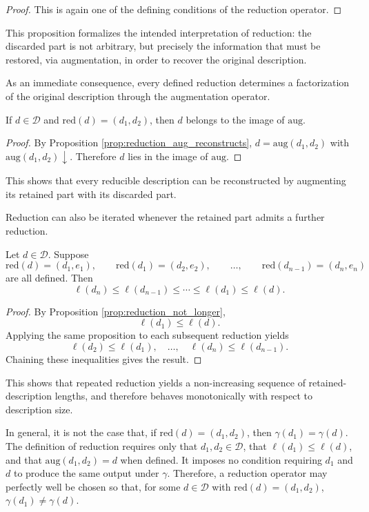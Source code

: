 \begin{proof}
This is again one of the defining conditions of the reduction operator.
\end{proof}

This proposition formalizes the intended interpretation of reduction: the discarded part is not arbitrary, but precisely the information that must be restored, via augmentation, in order to recover the original description.

As an immediate consequence, every defined reduction determines a factorization of the original description through the augmentation operator.

\begin{corollary}
If \(d \in \mathcal{D}\) and \(\mathrm{red}(d)=(d_1,d_2)\), then \(d\) belongs to the image of \(\mathrm{aug}\).
\end{corollary}

\begin{proof}
By Proposition \ref{prop:reduction_aug_reconstructs}, $d=\mathrm{aug}(d_1,d_2)$ with \(\mathrm{aug}(d_1,d_2)\downarrow\). Therefore \(d\) lies in the image of \(\mathrm{aug}\).
\end{proof}

This shows that every reducible description can be reconstructed by augmenting its retained part with its discarded part.

Reduction can also be iterated whenever the retained part admits a further reduction.

\begin{proposition}
Let \(d \in \mathcal{D}\). Suppose
\[
\mathrm{red}(d)=(d_1,e_1),
\qquad
\mathrm{red}(d_1)=(d_2,e_2),
\qquad
\ldots,
\qquad
\mathrm{red}(d_{n-1})=(d_n,e_n)
\]
are all defined. Then
\[
\ell(d_n)\leq \ell(d_{n-1})\leq \cdots \leq \ell(d_1)\leq \ell(d).
\]
\end{proposition}
\begin{proof}
By Proposition \ref{prop:reduction_not_longer},
\[
\ell(d_1)\leq \ell(d).
\]
Applying the same proposition to each subsequent reduction yields
\[
\ell(d_2)\leq \ell(d_1),\quad \ldots,\quad \ell(d_n)\leq \ell(d_{n-1}).
\]
Chaining these inequalities gives the result.
\end{proof}

This shows that repeated reduction yields a non-increasing sequence of retained-description lengths, and therefore behaves monotonically with respect to description size.

In general, it is not the case that, if \(\mathrm{red}(d)=(d_1,d_2)\), then $\gamma(d_1)=\gamma(d)$. The definition of reduction requires only that \(d_1,d_2\in\mathcal{D}\), that \(\ell(d_1)\leq \ell(d)\), and that $\mathrm{aug}(d_1,d_2)=d$ when defined. It imposes no condition requiring \(d_1\) and \(d\) to produce the same output under \(\gamma\). Therefore, a reduction operator may perfectly well be chosen so that, for some \(d\in\mathcal{D}\) with \(\mathrm{red}(d)=(d_1,d_2)\), $\gamma(d_1)\neq \gamma(d)$.

